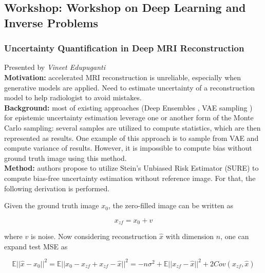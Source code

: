 \subsection{Workshop: Workshop on Deep Learning and Inverse Problems}

\subsubsection{Uncertainty Quantification in Deep MRI
Reconstruction \cite{edupuganti2020uncertainty}}

Presented by \textit{Vineet Edupuganti} \\

{\bf Motivation:} accelerated MRI reconstruction is unreliable, especially when generative models are applied. Need to estimate uncertainty of a reconstruction model to help radiologist to avoid mistakes. \\

{\bf Background:} most of existing approaches (Deep Ensembles \cite{Lakshminarayanan17}, VAE sampling \cite{corr/abs-2007-08128}) for epistemic uncertainty estimation leverage one or another form of the Monte Carlo sampling: several samples are utilized to compute statistics, which are then represented as results. One example of this approach is to sample from VAE and compute variance of results. However, it is impossible to compute bias without ground truth image using this method. \\

{\bf Method:} authors propose to utilize  Stein’s Unbiased Risk Estimator
(SURE) \cite{doi:10.1080/01621459.2018.1429276} to compute bias-free uncertainty estimation without reference image. For that, the following derivation is performed.

Given the ground truth image $x_0$, the zero-filled image can
be written as 

\begin{equation}
    x_{zf} = x_0 + v
\end{equation} 

where $v$ is noise. Now considering reconstruction $\hat{x}$ with
dimension $n$, one can expand test MSE as 

\begin{equation}
    \mathbb{E}|| \hat{x} - x_0 ||^2 = \mathbb{E} || x_0 - x_{zf} + x_{zf} - \hat{x} ||^2 = -n \sigma^2  + \mathbb{E} || x_{zf} - \hat{x} ||^2 + 2Cov(x_{zf}, \hat{x})
    \label{eq:sure-one}
\end{equation} 

